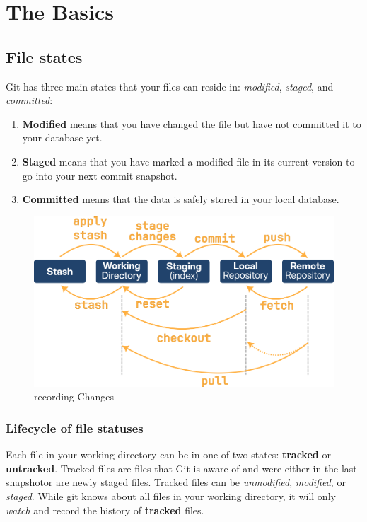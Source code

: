 \chapter{The Basics}
\chapteroverlay
\section{File states}
Git has three main states that your files can reside in: \textit{modified}, \textit{staged}, and \textit{committed}:
\begin{enumerate}
    \item \textbf{Modified} means that you have changed the file but have not committed it to your database yet.
    \item \textbf{Staged} means that you have marked a modified file in its current version to go into your next commit snapshot.
    \item \textbf{Committed} means that the data is safely stored in your local database.
\end{enumerate}

\begin{figure}[H]
\centering
    \centering
    \includegraphics[scale=1]{Images/recordingChanges.png}
    \caption{recording Changes}
\end{figure}
    
\subsection{Lifecycle of file statuses}
Each file in your working directory can be in one of two states: \textbf{tracked} or \textbf{untracked}. Tracked files are files that Git is aware of and were either in the last snapshot\footnotemark or are newly staged files.
Tracked files can be \textit{unmodified}, \textit{modified}, or \textit{staged}. \newline
While git knows about all files in your working directory, it will only \textit{watch} and record the history of \textbf{tracked} files.

